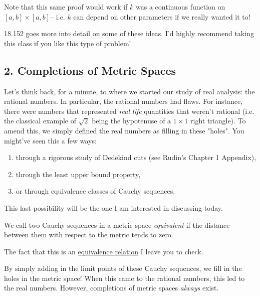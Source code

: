 \begin{remark}
    Note that this same proof would work if $k$ was a continuous function on $[a,b]\times [a,b]$-- i.e. $k$ can depend on other parameters if we really wanted it to!
\end{remark}

\begin{remark}
    18.152 goes more into detail on some of these ideas. I'd highly recommend taking this class if you like this type of problem!
\end{remark}

\subsection*{2. Completions of Metric Spaces}

Let's think back, for a minute, to where we started our study of real analysis: the rational numbers. In particular, the rational numbers had flaws. For instance, there were numbers that represented \textit{real life} quantities that weren't rational (i.e. the classical example of $\sqrt{2}$ being the hypotenuse of a $1\times 1$ right triangle). To amend this, we simply defined the real numbers as filling in these "holes". You might've seen this a few ways:
\begin{enumerate}
    \item through a rigorous study of Dedekind cuts (see Rudin's Chapter 1 Appendix),
    \item through the least upper bound property,
    \item or through equivalence classes of Cauchy sequences.
\end{enumerate}
This last possibility will be the one I am interested in discussing today. 


\begin{definition}
    We call two Cauchy sequences in a metric space \textit{equivalent} if the distance between them with respect to the metric tends to zero. 
\end{definition}
\begin{remark}
    The fact that this is an \href{https://en.wikipedia.org/wiki/Equivalence_relation}{equivalence relation} I leave you to check.
\end{remark}

By simply adding in the limit points of these Cauchy sequences, we fill in the holes in the metric space! When this came to the rational numbers, this led to the real numbers. However, completions of metric spaces \textit{always} exist.

